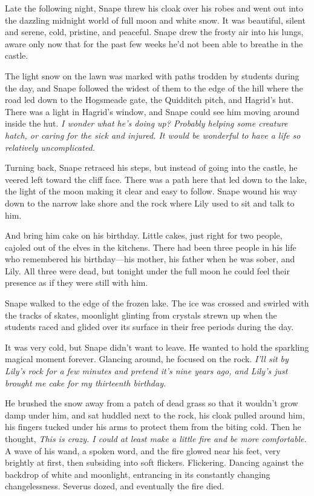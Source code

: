 Late the following night, Snape threw his cloak over his robes and went out into the dazzling midnight world of full moon and white snow. It was beautiful, silent and serene, cold, pristine, and peaceful. Snape drew the frosty air into his lungs, aware only now that for the past few weeks he'd not been able to breathe in the castle.

The light snow on the lawn was marked with paths trodden by students during the day, and Snape followed the widest of them to the edge of the hill where the road led down to the Hogsmeade gate, the Quidditch pitch, and Hagrid's hut. There was a light in Hagrid's window, and Snape could see him moving around inside the hut. \emph{I wonder what he's doing up? Probably helping some creature hatch, or caring for the sick and injured. It would be wonderful to have a life so relatively uncomplicated.}

Turning back, Snape retraced his steps, but instead of going into the castle, he veered left toward the cliff face. There was a path here that led down to the lake, the light of the moon making it clear and easy to follow. Snape wound his way down to the narrow lake shore and the rock where Lily used to sit and talk to him.

And bring him cake on his birthday. Little cakes, just right for two people, cajoled out of the elves in the kitchens. There had been three people in his life who remembered his birthday—his mother, his father when he was sober, and Lily. All three were dead, but tonight under the full moon he could feel their presence as if they were still with him.

Snape walked to the edge of the frozen lake. The ice was crossed and swirled with the tracks of skates, moonlight glinting from crystals strewn up when the students raced and glided over its surface in their free periods during the day.

It was very cold, but Snape didn't want to leave. He wanted to hold the sparkling magical moment forever. Glancing around, he focused on the rock. \emph{I'll sit by Lily's rock for a few minutes and pretend it's nine years ago, and Lily's just brought me cake for my thirteenth birthday.}

He brushed the snow away from a patch of dead grass so that it wouldn't grow damp under him, and sat huddled next to the rock, his cloak pulled around him, his fingers tucked under his arms to protect them from the biting cold. Then he thought, \emph{This is crazy. I could at least make a little fire and be more comfortable.} A wave of his wand, a spoken word, and the fire glowed near his feet, very brightly at first, then subsiding into soft flickers. Flickering. Dancing against the backdrop of white and moonlight, entrancing in its constantly changing changelessness. Severus dozed, and eventually the fire died.

